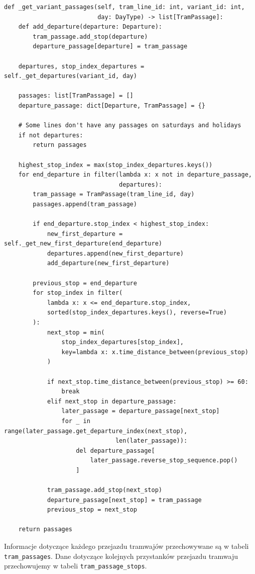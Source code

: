\documentclass[12pt,a4paper]{article}
\begin{document}
\begin{verbatim}
def _get_variant_passages(self, tram_line_id: int, variant_id: int,
                          day: DayType) -> list[TramPassage]:
    def add_departure(departure: Departure):
        tram_passage.add_stop(departure)
        departure_passage[departure] = tram_passage

    departures, stop_index_departures = self._get_departures(variant_id, day)

    passages: list[TramPassage] = []
    departure_passage: dict[Departure, TramPassage] = {}

    # Some lines don't have any passages on saturdays and holidays
    if not departures:
        return passages

    highest_stop_index = max(stop_index_departures.keys())
    for end_departure in filter(lambda x: x not in departure_passage,
                                departures):
        tram_passage = TramPassage(tram_line_id, day)
        passages.append(tram_passage)

        if end_departure.stop_index < highest_stop_index:
            new_first_departure = self._get_new_first_departure(end_departure)
            departures.append(new_first_departure)
            add_departure(new_first_departure)

        previous_stop = end_departure
        for stop_index in filter(
            lambda x: x <= end_departure.stop_index,
            sorted(stop_index_departures.keys(), reverse=True)
        ):
            next_stop = min(
                stop_index_departures[stop_index],
                key=lambda x: x.time_distance_between(previous_stop)
            )

            if next_stop.time_distance_between(previous_stop) >= 60:
                break
            elif next_stop in departure_passage:
                later_passage = departure_passage[next_stop]
                for _ in range(later_passage.get_departure_index(next_stop),
                               len(later_passage)):
                    del departure_passage[
                        later_passage.reverse_stop_sequence.pop()
                    ]

            tram_passage.add_stop(next_stop)
            departure_passage[next_stop] = tram_passage
            previous_stop = next_stop

    return passages
\end{verbatim}

            Informacje dotyczące każdego przejazdu tramwajów przechowywane są w tabeli \texttt{tram\_passages}. Dane dotyczące kolejnych przystanków przejazdu tramwaju przechowujemy w tabeli \linebreak \texttt{tram\_passage\_stops}.
\end{document}

